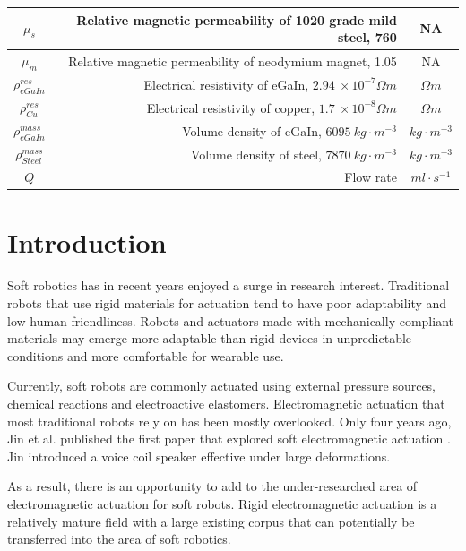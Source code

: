 \documentclass[a4paper,12pt]{article}
\begin{document}
\begin{center}
\begin{tabular}{c | D | c}
        $\mu_s$ & Relative magnetic permeability of 1020 grade mild steel, 760 \cite{baartmanMaterialsLibraryFEMM2007} & NA \\
        \hline
        $\mu_m$ & Relative magnetic permeability of neodymium magnet, 1.05 \cite{engineeringtoolboxPermeability2016} & NA \\
        \hline
        $\rho^{res}_{eGaIn}$ & Electrical resistivity of eGaIn, $2.94\ \times10^{-7} \Omega m$ \cite{zrnicResistivitySurfaceTension1969} & $\Omega m$ \\
        \hline
        $\rho^{res}_{Cu}$ & Electrical resistivity of copper, $1.7\ \times10^{-8} \Omega m$ \cite{dickeyEutecticGalliumIndiumEGaIn2008} & $\Omega m$ \\
        \hline
        $\rho^{mass}_{eGaIn}$ & Volume density of eGaIn, $6095\ kg\cdot m^{-3}$\cite{xuEffectOxidationMechanical2012} & $kg\cdot m^{-3}$ \\
        \hline
        $\rho^{mass}_{Steel}$ & Volume density of steel, $7870\ kg\cdot m^{-3}$ \cite{saysAISI1020Carbon2013} & $kg\cdot m^{-3}$ \\
        \hline
        $Q$ & Flow rate & $ml\cdot s^{-1}$
    \end{tabular}
\end{center}

\newpage

\section{Introduction}

Soft robotics has in recent years enjoyed a surge in research interest. Traditional robots that use rigid materials for actuation tend to have poor adaptability and low human friendliness. Robots and actuators made with mechanically compliant materials may emerge more adaptable than rigid devices in unpredictable conditions and more comfortable for wearable use.

Currently, soft robots are commonly actuated using external pressure sources, chemical reactions and electroactive elastomers. Electromagnetic actuation that most traditional robots rely on has been mostly overlooked. Only four years ago, Jin et al. published the first paper that explored soft electromagnetic actuation \cite{jinStretchableLoudspeakerUsing2015}. Jin introduced a voice coil speaker effective under large deformations.

As a result, there is an opportunity to add to the under-researched area of electromagnetic actuation for soft robots. Rigid electromagnetic actuation is a relatively mature field with a large existing corpus that can potentially be transferred into the area of soft robotics.
\end{document}
